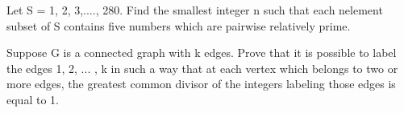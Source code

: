 \item Let S = {1, 2, 3,...., 280}. Find the smallest integer n such that each nelement subset of S contains five numbers which are pairwise relatively prime.\\

\item Suppose G is a connected graph with k edges. Prove that it is possible to label the edges 1, 2, ... , k in such a way that at each vertex which belongs to two or more edges, the greatest common divisor of the integers labeling those edges is equal to 1.
